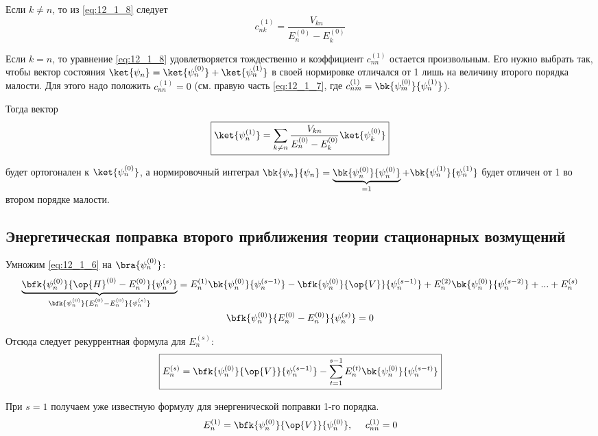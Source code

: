 Если $k \neq n$, то из \eqref{eq:12_1_8} следует
\begin{equation}
\label{eq:12_1_9}
c_{nk}^{(1)} = \frac{V_{kn}}{E_n^{(0)} - E_k^{(0)}}
\end{equation}

Если $k = n$, то уравнение \eqref{eq:12_1_8} удовлетворяется тождественно и коэффициент $c_{nn}^{(1)}$ остается произвольным. Его нужно выбрать так, чтобы вектор состояния $\ket{\psi_n} = \ket{\psi_n^{(0)}} + \ket{\psi_n^{(1)}}$ в своей нормировке отличался от 1 лишь на величину второго порядка малости. Для этого надо положить $c_{nn}^{(1)} = 0$ (см. правую часть \eqref{eq:12_1_7}, где $c_{nm}^{(1)} = \bk{\psi_m^{(0)}}{\psi_n^{(1)}}$).

Тогда вектор
\begin{equation}
\label{eq:12_1_10}
\boxed{\ket{\psi_n^{(1)}}= \sum_{k \neq n} \frac{V_{kn}}{E_n^{(0)} - E_k^{(0)}} \ket{\psi_k^{(0)}}}
\end{equation}

будет ортогонален к $\ket{\psi_n^{(0)}}$, а нормировочный интеграл $\bk{\psi_n}{\psi_n} = \underbrace{\bk{\psi_n^{(0)}}{\psi_n^{(0)}}}_{=1} + \bk{\psi_n^{(1)}}{\psi_n^{(1)}}$ будет отличен от 1 во втором порядке малости.

\subsection{Энергетическая поправка второго приближения теории стационарных возмущений}

Умножим \eqref{eq:12_1_6} на $\bra{\psi_n^{(0)}}$:
\begin{gather*}
\underbrace{\bfk{\psi_n^{(0)}}{\op{H}^{(0)} - E_n^{(0)}} {\psi_n^{(s)}}}_{\bfk{\psi_n^{(0)}}{E_n^{(0)} - E_n^{(0)}}{\psi_n^{(s)}}} = E_n^{(1)} \bk{\psi_n^{(0)}}{\psi_n^{(s-1)}} - \bfk{\psi_n^{(0)}}{\op{V}}{\psi_n^{(s-1)}} + E_n^{(2)}\bk{\psi_n^{(0)}}{\psi_n^{(s-2)}}+...+E_n^{(s)}\\
\bfk{\psi_n^{(0)}}{E_n^{(0)} - E_n^{(0)}}{\psi_n^{(s)}} = 0
\end{gather*}

Отсюда следует рекуррентная формула для $E_n^{(s)}$:
$$
\boxed{E_n^{(s)} = \bfk{\psi_n^{(0)}}{\op{V}}{\psi_n^{(s-1)}} - \sum_{t=1}^{s-1} E_n^{(t)} \bk{\psi_n^{(0)}}{\psi_n^{(s-t)}}}
$$

При $s=1$ получаем уже известную формулу для энергенической поправки 1-го порядка.
$$
E_n^{(1)} = \bfk{\psi_n^{(0)}}{\op{V}}{\psi_n^{(0)}}, ~~~~c_{nn}^{(1)} = 0
$$

